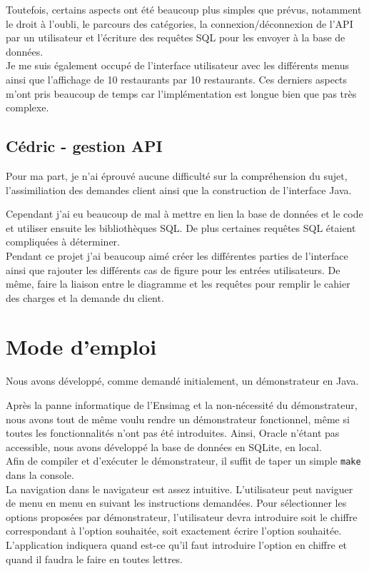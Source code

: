 \documentclass[10pt, a4paper]{article}
\begin{document}
Toutefois, certains aspects ont été beaucoup plus simples que prévus, notamment le droit à l'oubli,
le parcours des catégories, la connexion/déconnexion de l'API par un utilisateur et l'écriture
des requêtes SQL pour les envoyer à la base de données.\\

Je me suis également occupé de l'interface utilisateur avec les différents menus ainsi que l'affichage
de 10 restaurants par 10 restaurants. Ces derniers aspects m'ont pris beaucoup de temps car
l'implémentation est longue bien que pas très complexe.

\subsection{Cédric - gestion API}
Pour ma part, je n'ai éprouvé aucune difficulté sur la compréhension du sujet, l'assimiliation
des demandes client ainsi que la construction de l'interface Java.

Cependant j'ai eu beaucoup de mal à mettre en lien la base de données et le code et utiliser ensuite
les bibliothèques SQL. De plus certaines requêtes SQL étaient compliquées à déterminer.\\

Pendant ce projet j'ai beaucoup aimé créer les différentes parties de l'interface ainsi
que rajouter les différents cas de figure pour les entrées utilisateurs. De même, faire la liaison
entre le diagramme et les requêtes pour remplir le cahier des charges et la demande du client.

\section{Mode d'emploi}

Nous avons développé, comme demandé initialement, un démonstrateur en Java.

Après la panne informatique de l'Ensimag et la non-nécessité du démonstrateur, nous avons tout de même voulu
rendre un démonstrateur fonctionnel, même si toutes les fonctionnalités n'ont pas été introduites. Ainsi, Oracle n'étant pas accessible,
nous avons développé la base de données en SQLite, en local. \\

Afin de compiler et d'exécuter le démonstrateur, il suffit de taper un simple {\tt make} dans la console. \\

La navigation dans le navigateur est assez intuitive. L'utilisateur peut naviguer de menu en menu en suivant
les instructions demandées. Pour sélectionner les options proposées par  démonstrateur, l'utilisateur devra
introduire soit le chiffre correspondant à l'option souhaitée, soit exactement écrire l'option souhaitée.
L'application indiquera quand est-ce qu'il faut introduire l'option en chiffre et quand il faudra le faire en toutes lettres. \\
\end{document}
